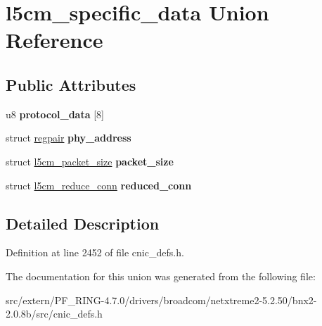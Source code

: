 \hypertarget{unionl5cm__specific__data}{
\section{l5cm\_\-specific\_\-data Union Reference}
\label{unionl5cm__specific__data}
}
\subsection*{Public Attributes}
\begin{DoxyCompactItemize}
\item 
\hypertarget{unionl5cm__specific__data_ac5bbf68b5bdc062f8014e265d46df7bb}{
u8 {\bfseries protocol\_\-data} \mbox{[}8\mbox{]}}
\label{unionl5cm__specific__data_ac5bbf68b5bdc062f8014e265d46df7bb}

\item 
\hypertarget{unionl5cm__specific__data_a8cb9e923da15ce9e343f44df8feec15c}{
struct \hyperlink{structregpair}{regpair} {\bfseries phy\_\-address}}
\label{unionl5cm__specific__data_a8cb9e923da15ce9e343f44df8feec15c}

\item 
\hypertarget{unionl5cm__specific__data_aba0775efd8dbccecd208ad134487cbfa}{
struct \hyperlink{structl5cm__packet__size}{l5cm\_\-packet\_\-size} {\bfseries packet\_\-size}}
\label{unionl5cm__specific__data_aba0775efd8dbccecd208ad134487cbfa}

\item 
\hypertarget{unionl5cm__specific__data_ad11de30ecc55d6a8b166df68f4804885}{
struct \hyperlink{structl5cm__reduce__conn}{l5cm\_\-reduce\_\-conn} {\bfseries reduced\_\-conn}}
\label{unionl5cm__specific__data_ad11de30ecc55d6a8b166df68f4804885}

\end{DoxyCompactItemize}


\subsection{Detailed Description}


Definition at line 2452 of file cnic\_\-defs.h.



The documentation for this union was generated from the following file:\begin{DoxyCompactItemize}
\item 
src/extern/PF\_\-RING-\/4.7.0/drivers/broadcom/netxtreme2-\/5.2.50/bnx2-\/2.0.8b/src/cnic\_\-defs.h\end{DoxyCompactItemize}

